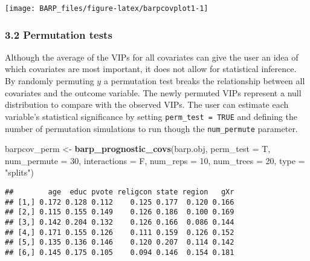 \documentclass[]{article}
\newenvironment{Shaded}{\begin{snugshade}}{\end{snugshade}}
\newcommand{\KeywordTok}[1]{\textcolor[rgb]{0.13,0.29,0.53}{\textbf{#1}}}
\newcommand{\DataTypeTok}[1]{\textcolor[rgb]{0.13,0.29,0.53}{#1}}
\newcommand{\DecValTok}[1]{\textcolor[rgb]{0.00,0.00,0.81}{#1}}
\newcommand{\StringTok}[1]{\textcolor[rgb]{0.31,0.60,0.02}{#1}}
\newcommand{\OperatorTok}[1]{\textcolor[rgb]{0.81,0.36,0.00}{\textbf{#1}}}
\newcommand{\NormalTok}[1]{#1}
\begin{document}
\begin{center}\texttt{[image: BARP\_files/figure-latex/barpcovplot1-1]} \end{center}

\subsubsection{3.2 Permutation tests}\label{permutation-tests}

Although the average of the VIPs for all covariates can give the user an
idea of which covariates are most important, it does not allow for
statistical inference. By randomly permuting \(y\) a permutation test
breaks the relationship between all covariates and the outcome variable.
The newly permuted VIPs represent a null distribution to compare with
the observed VIPs. The user can estimate each variable's statistical
significance by setting \texttt{perm\_test\ =\ TRUE} and defining the
number of permutation simulations to run though the
\texttt{num\_permute} parameter.

\begin{Shaded}
\begin{Highlighting}[]
\NormalTok{barpcov_perm <-}\StringTok{ }\KeywordTok{barp_prognostic_covs}\NormalTok{(barp.obj,}
                                \DataTypeTok{perm_test =}\NormalTok{ T,}
                                \DataTypeTok{num_permute =} \DecValTok{30}\NormalTok{,}
                                \DataTypeTok{interactions =}\NormalTok{ F,}
                                \DataTypeTok{num_reps =} \DecValTok{10}\NormalTok{,}
                                \DataTypeTok{num_trees =} \DecValTok{20}\NormalTok{,}
                                \DataTypeTok{type =} \StringTok{"splits"}\NormalTok{)}
\end{Highlighting}
\end{Shaded}

\begin{Shaded}
\end{Shaded}

\begin{verbatim}
##        age  educ pvote religcon state region   gXr
## [1,] 0.172 0.128 0.112    0.125 0.177  0.120 0.166
## [2,] 0.115 0.155 0.149    0.126 0.186  0.100 0.169
## [3,] 0.142 0.204 0.132    0.126 0.166  0.086 0.144
## [4,] 0.171 0.155 0.126    0.111 0.159  0.126 0.152
## [5,] 0.135 0.136 0.146    0.120 0.207  0.114 0.142
## [6,] 0.145 0.175 0.105    0.094 0.146  0.154 0.181
\end{verbatim}
\end{document}
